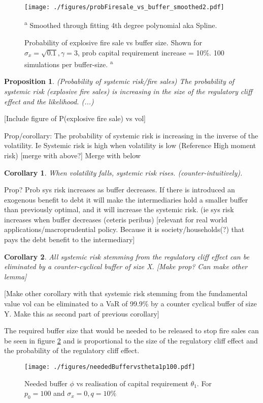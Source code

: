\documentclass[11pt]{article}
\newtheorem{proposition}{Proposition}
\newtheorem{corollary}{Corollary}
\begin{document}
\begin{figure}[h]
\centering
\texttt{[image: ./figures/probFiresale\_vs\_buffer\_smoothed2.pdf]}
\caption{Probability of explosive fire sale vs buffer size. Shown for $\sigma_x = \sqrt{0.1}, \gamma = 3$, prob capital requirement increase = 10\%. 100 simulations per buffer-size.\textsuperscript{\color{blue} a}}
{\small\textsuperscript{{\color{blue} a}} Smoothed through fitting 4th degree polynomial aka Spline.}
\label{f_probFSvsBuffer}
\end{figure}


\begin{proposition} (Probability of systemic risk/fire sales)
The probability of systemic risk (explosive fire sales) is increasing in the size of the regulatory cliff effect and the likelihood. (...)
\end{proposition}

[Include figure of P(explosive fire sale) vs vol]

Prop/corollary: The probability of systemic risk is increasing in the inverse of the volatility. Ie Systemic risk is high when volatility is low (Reference High moment risk) [merge with above?]
Merge with below
\begin{corollary}
When volatility falls, systemic risk rises. (counter-intuitively).
\end{corollary}

Prop? Prob sys risk increases as buffer decreases. If there is introduced an exogenous benefit to debt it will make the intermediaries hold a smaller buffer than previously optimal, and it will increase the systemic risk. (ie sys risk increases when buffer decreases (ceteris peribus) [relevant for real world applications/macroprudential policy. Because it is society/households(?) that pays the debt benefit to the intermediary]

\begin{corollary}
All systemic risk stemming from the regulatory cliff effect can be eliminated by a counter-cyclical buffer of size X. [Make prop? Can make other lemma] 
\end{corollary}

[Make other corollary with that systemic risk stemming from the fundamental value vol can be eliminated to a VaR of 99.9\% by a counter cyclical buffer of size Y. Make this as second part of previous corollary]

The required buffer size that would be needed to be released to stop fire sales can be seen in figure \ref{f_neededBuffervsRegSize} and is proportional to the size  of the regulatory cliff effect and the probability of the regulatory cliff effect.
\begin{figure}[h]
\centering
\texttt{[image: ./figures/neededBuffervstheta1p100.pdf]}
\caption{Needed buffer $\phi$ vs realisation of capital requirement  $\theta_1$. For $p_0 = 100$ and $\sigma_x = 0, q = 10\%$}
\label{f_neededBuffervsRegSize}
\end{figure}
\end{document}
